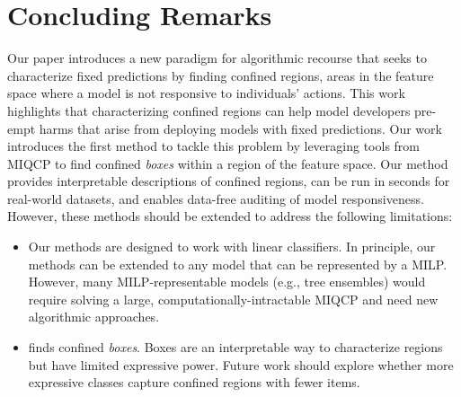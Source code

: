 \section{Concluding Remarks}
Our paper introduces a new paradigm for algorithmic recourse that seeks to characterize fixed predictions by finding confined regions, areas in the feature space where a model is not responsive to individuals' actions. This work highlights that characterizing confined regions can help model developers pre-empt harms that arise from deploying models with fixed predictions. Our work introduces the first method to tackle this problem by leveraging tools from MIQCP to find confined \emph{boxes} within a region of the feature space. Our method provides interpretable descriptions of confined regions, can be run in seconds for real-world datasets, and enables data-free auditing of model responsiveness. However, these methods should be extended to address the following limitations:
\vspace{-1em}
\begin{itemize}[leftmargin=*, itemsep=0pt]
    \item Our methods are designed to work with linear classifiers. In principle, our methods can be extended to any model that can be represented by a MILP. However, many MILP-representable models (e.g., tree ensembles) would require solving a large, computationally-intractable MIQCP and need new algorithmic approaches.
    \item \us{} finds confined \emph{boxes}. Boxes are an interpretable way to characterize regions but have limited expressive power. Future work should explore whether more expressive classes capture confined regions with fewer items.
\end{itemize}